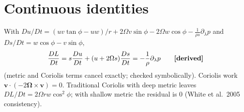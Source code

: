 \section{Continuous identities}\label{sec:continuous}
With $Du/Dt=(uv\tan\phi-uw)/r+2\Omega v\sin\phi-2\Omega w\cos\phi-\frac{1}{\rho s}\partial_\lambda p$
and $Ds/Dt=w\cos\phi-v\sin\phi$,
\[ \frac{DL}{Dt}=s\frac{Du}{Dt}+(u+2\Omega s)\frac{Ds}{Dt}=-\frac{1}{\rho}\partial_\lambda p \qquad\textbf{[derived]} \]
(metric and Coriolis terms cancel exactly; checked symbolically). Coriolis work $\bm v\cdot(-2\bm\Omega\times\bm v)=0$.
Traditional Coriolis with deep metric leaves $DL/Dt=2\Omega r w\cos^2\phi$; with shallow metric the residual is 0
(White et al.\ 2005 consistency). \derived
